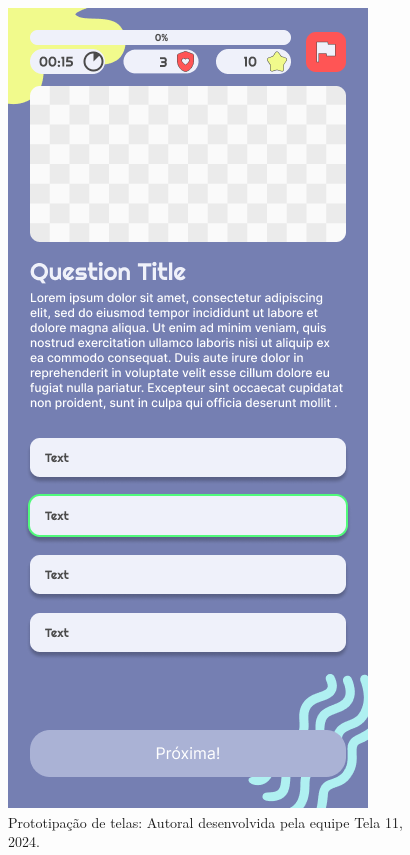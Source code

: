 \documentclass[12pt, openany, oneside, a4paper, english, brazil]{abntex2}   %
\begin{document}
\begin{figure}
    \centering
    \includegraphics[scale=0.7]{figuras/Math.Pow App/Question Multiple Choice WIth Image.png}
    \caption{Prototipação de telas: Autoral desenvolvida pela equipe Tela 11, 2024.}
    \label{fig:nome-da-imagem}
\end{figure}
\end{document}
